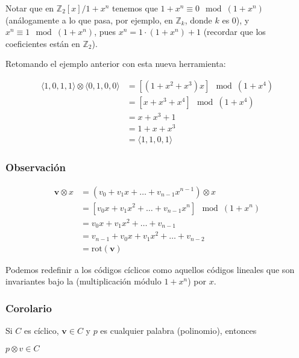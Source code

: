 \documentclass[10pt,a4paper]{article}
\begin{document}
Notar que en $\mathbb{Z}_2\left[x\right]/1+ x^n$ tenemos que $1+x^n \equiv 0 \mod(1+x^n)$ (análogamente a lo que pasa, por ejemplo, en $\mathbb{Z}_k$, donde $k$ es $0$), y $x^n\equiv1 \mod (1 + x^n)$, pues $x^n = 1 \cdot (1+x^n) + 1$ (recordar que los coeficientes están en $\mathbb{Z}_2$).

Retomando el ejemplo anterior con esta nueva herramienta:

\begin{center}
\begin{align*} \langle 1, 0, 1, 1\rangle \otimes \langle0, 1, 0, 0\rangle &=\left[(1 + x^2 + x^3) x\right]\mod(1+x^4)\\ &= \left[x + x^3 + x^4\right]\mod(1+x^4)\\ &= x+ x^3 + 1\\ &= 1 + x + x^3\\ &= \langle 1, 1, 0, 1\rangle \end{align*}
\end{center}

\subsubsection*{Observación}

\begin{center}
\begin{align*} \textbf{v} \otimes x &=(v_0 + v_1x + \dots + v_{n-1}x^{n-1}) \otimes x\\ &= \left[v_0x + v_1x^2 + \dots + v_{n-1}x^{n}\right]\mod(1+x^n)\\ &= v_0x+v_1x^2+\dots + v_{n-1}\\ &= v_{n-1} + v_0x+v_1x^2 + \dots+v_{n-2}\\ &= \text{rot}(\textbf{v}) \end{align*}
\end{center}

Podemos redefinir a los códigos cíclicos como aquellos códigos lineales que son invariantes bajo la (multiplicación módulo $1+ x^n$) por $x $.

\subsubsection*{Corolario}

Si $C$ es cíclico, $\textbf{v} \in C$ y $p$ es cualquier palabra (polinomio), entonces

\begin{center}
$p\otimes v \in C$
\end{center}
\end{document}
